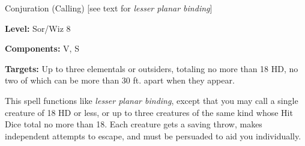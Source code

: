 \label{spell:Greater Planar Binding}

Conjuration (Calling) [see text for \textit{lesser planar binding}]

\textbf{Level:} Sor/Wiz 8

\textbf{Components:} V, S

\textbf{Targets:} Up to three elementals or outsiders, totaling no more than 18 
HD, no two of which can be more than 30 ft. apart when they appear.

This spell functions like \textit{lesser planar binding}, except that you may call 
a single creature of 18 HD or less, or up to three creatures of the same kind whose 
Hit Dice total no more than 18. Each creature gets a saving throw, makes independent 
attempts to escape, and must be persuaded to aid you individually.

